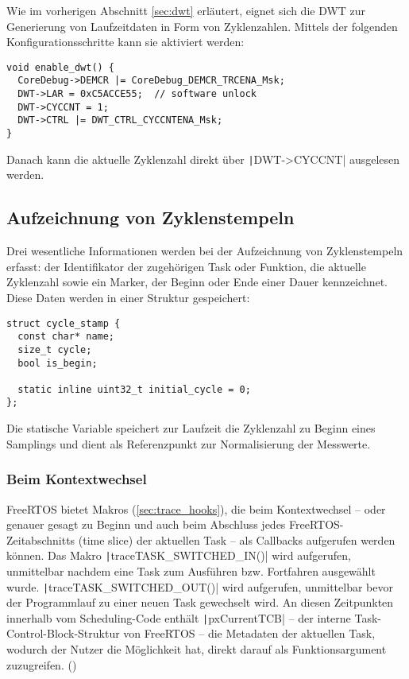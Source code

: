 Wie im vorherigen Abschnitt \ref{sec:dwt} erläutert, eignet sich die DWT zur
Generierung von Laufzeitdaten in Form von Zyklenzahlen. Mittels der folgenden
Konfigurationsschritte kann sie aktiviert werden:

\begin{code}
\begin{verbatim}
void enable_dwt() {
  CoreDebug->DEMCR |= CoreDebug_DEMCR_TRCENA_Msk;
  DWT->LAR = 0xC5ACCE55;  // software unlock
  DWT->CYCCNT = 1;
  DWT->CTRL |= DWT_CTRL_CYCCNTENA_Msk;
}
\end{verbatim}
\end{code}

Danach kann die aktuelle Zyklenzahl direkt über \texttt|DWT->CYCCNT|
ausgelesen werden.

\subsection{Aufzeichnung von Zyklenstempeln}

Drei wesentliche Informationen werden bei der Aufzeichnung von Zyklenstempeln
erfasst: der Identifikator der zugehörigen Task oder Funktion, die aktuelle
Zyklenzahl sowie ein Marker, der Beginn oder Ende einer Dauer kennzeichnet.
Diese Daten werden in einer Struktur gespeichert:

\begin{code}
\begin{verbatim}
struct cycle_stamp {
  const char* name;
  size_t cycle;
  bool is_begin;

  static inline uint32_t initial_cycle = 0;
};
\end{verbatim}
\end{code}

Die statische Variable speichert zur Laufzeit die Zyklenzahl zu Beginn eines
Samplings und dient als Referenzpunkt zur Normalisierung der Messwerte.

\subsubsection{Beim Kontextwechsel}

FreeRTOS bietet Makros (\ref{sec:trace_hooks}), die beim Kontextwechsel -- oder
genauer gesagt zu Beginn und auch beim Abschluss jedes FreeRTOS-Zeitabschnitts
(time slice) der aktuellen Task -- als Callbacks aufgerufen werden können. Das
Makro \texttt|traceTASK_SWITCHED_IN()| wird aufgerufen, unmittelbar
nachdem eine Task zum Ausführen bzw. Fortfahren ausgewählt wurde.
\texttt|traceTASK_SWITCHED_OUT()| wird aufgerufen, unmittelbar bevor
der Programmlauf zu einer neuen Task gewechselt wird. An diesen Zeitpunkten
innerhalb vom Scheduling-Code enthält \texttt|pxCurrentTCB| -- der
interne Task-Control-Block-Struktur von FreeRTOS -- die Metadaten der aktuellen
Task, wodurch der Nutzer die Möglichkeit hat, direkt darauf als
Funktionsargument zuzugreifen. (\cite{freertos_rtos_trace_hooks})

